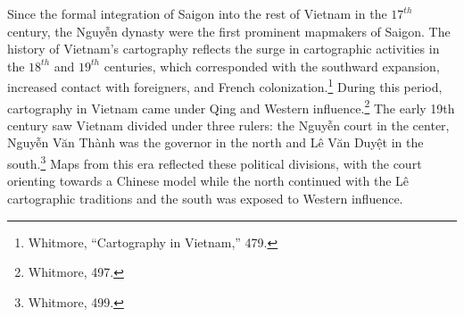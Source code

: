 \en


\begin{figure}[!ht]
\end{figure}

Since the formal integration of Saigon into the rest of Vietnam in the $17^{th}$ century, the \vi Nguyễn dynasty were the first prominent mapmakers of Saigon. The history of Vietnam’s cartography reflects the surge in cartographic activities in the $18^{th}$ and $19^{th}$ centuries, which corresponded with the southward expansion, increased contact with foreigners, and French colonization.\footnote{Whitmore, “Cartography in Vietnam,” 479.} During this period, cartography in Vietnam came under Qing and Western influence.\footnote{Whitmore, 497.} The early 19th century saw Vietnam divided under three rulers: the Nguyễn court in the center, Nguyễn Văn Thành was the governor in the north and Lê Văn Duyệt in the south.\footnote{Whitmore, 499.} Maps from this era reflected these political divisions, with the court orienting towards a Chinese model while the north continued with the Lê cartographic traditions and the south was exposed to Western influence.

